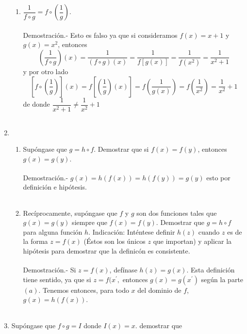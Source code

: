 \begin{enumerate}
\begin{enumerate}[\bfseries (a)]
		\item $\dfrac{1}{f \circ g} = f \circ \left( \dfrac{1}{g}\right).$\\\\
		    Demostración.-\;  Esto es falso ya que si consideramos $f(x)=x+1$ y $g(x)=x^2$, entonces 
		    $$\left( \dfrac{1}{f \circ g}\right) (x) = \dfrac{1}{(f\circ g)(x)} = \dfrac{1}{f\left[ g(x) \right]} = \dfrac{1}{f(x^2)} = \dfrac{1}{x^2+1}$$ y por otro lado 
		    $$\left[f\circ \left( \dfrac{1}{g}\right)\right](x)  = f\left[ \left( \dfrac{1}{g}\right) (x)\right] = f\left( \dfrac{1}{g(x)}\right) = f \left( \dfrac{1}{x^2}\right)= \dfrac{1}{x^2} + 1$$ 
		    de  donde $\dfrac{1}{x^2 + 1} \neq \dfrac{1}{x^2} + 1$\\\\

	    \end{enumerate}

	\item  
	\begin{enumerate}[\bfseries (a)]
	    
	    \item Supóngase que $g=h \circ f$. Demostrar que si $f(x)=f(y)$, entonces $g(x)=g(y)$.\\\\
		Demostración.-\;  $g(x)=h\left(f(x)\right) =h\left(f(y)\right) = g(y) $ esto por definición  e hipótesis.\\\\ 
	    
	    \item Recíprocamente, supóngase que $f$ y $g$ son dos funciones tales que $g(x)=g(y)$ siempre que $f(x)=f(y)$. Demostrar que $g = h\circ f$ para alguna función $h$. Indicación: Inténtese definir $h(z)$ cuando $z$ es de la forma $z=f(x)$ (Éstos son los únicos $z$ que importan) y aplicar la hipótesis para demostrar que la definicón es consistente.\\\\
		Demostración.-\; Si $z=f(x)$, defínase $h(z)=g(x)$. Esta definición tiene sentido, ya que si $z=f(x^{'},$ entonces $g(x)=g(x^{'})$ según la parte $(a)$. Tenemos entonces, para todo $x$ del dominio de $f$, $g(x)=h(f(x))$.\\\\

	\end{enumerate}

	\item Supóngase que $f\circ g = I$ donde $I(x)=x$. demostrar que 


\end{enumerate}
